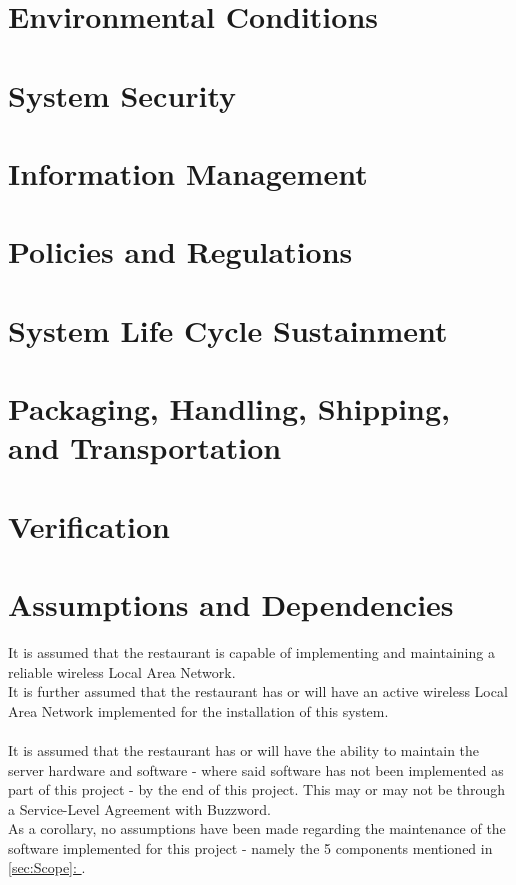 \documentclass[11pt, a4paper]{report}
\newcommand{\gref}[1]{\hyperref[#1]{\autoref*{#1}: \nameref{#1}}} %
\begin{document}
\section{Environmental Conditions}

\section{System Security}

\section{Information Management}

\section{Policies and Regulations}

\section{System Life Cycle Sustainment}

\section{Packaging, Handling, Shipping, and Transportation}

\section{Verification}

\section{Assumptions and Dependencies} \label{subsec:Assumptions}

It is assumed that the restaurant is capable of implementing and maintaining a reliable wireless Local Area Network.\\
It is further assumed that the restaurant has or will have an active wireless Local Area Network implemented for the installation of this system.\\
\\
It is assumed that the restaurant has or will have the ability to maintain the server hardware and software - where said software has not been implemented as part of this project - by the end of this project. This may or may not be through a Service-Level Agreement with Buzzword.\\
As a corollary, no assumptions have been made regarding the maintenance of the software implemented for this project - namely the 5 components mentioned in \gref{sec:Scope}.
\end{document}
